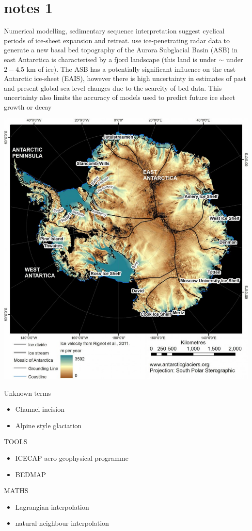 \chapter{notes 1}\label{n1}

Numerical modelling, sedimentary sequence interpretation suggest cyclical periods of ice-sheet expansion and retreat\cite{Young2011}. 
use ice-penetrating radar data to generate a new basal bed topography of the Aurora Subglacial Basin (ASB) in east Antarctica is characterised by a fjord landscape (this land is under $\sim$ under $2-4.5$ km of ice). The ASB has a potentially significant influence on the east Antarctic ice-sheet (EAIS), however there is high uncertainty in estimates of past and present global sea level changes due to the scarcity of bed data\cite{Young2011}. This uncertainty also limits the accuracy of models used to predict future ice sheet growth or decay

\begin{Figure}
\centering
\includegraphics[width=\linewidth]{antarctica_velocity.pdf}
\label{fig:Antarctica_velocity}
\end{Figure}

Unknown terms
{\small \begin{itemize}
\item{Channel incision}
\item{Alpine style glaciation}
\end{itemize}
}

TOOLS
{\small \begin{itemize}
\item{ICECAP aero geophysical programme}
\item{BEDMAP}
\end{itemize}
}

MATHS
{\small \begin{itemize}
\item{Lagrangian interpolation}
\item{natural-neighbour interpolation}
\end{itemize}
}
